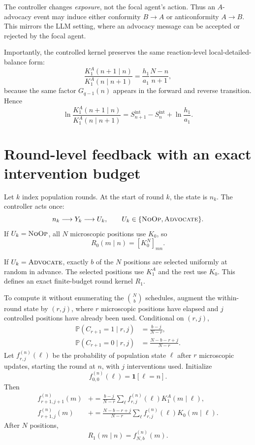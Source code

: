 \documentclass[11pt]{article}
\newcommand{\Adv}{\textsc{Advocate}}
\newcommand{\Noop}{\textsc{NoOp}}
\newcommand{\Prob}{\mathbb{P}}
\begin{document}
The controller changes \emph{exposure}, not the focal agent's action. Thus an
$A$-advocacy event may induce either conformity $B\to A$ or anticonformity
$A\to B$. This mirrors the LLM setting, where an advocacy message can be
accepted or rejected by the focal agent.

Importantly, the controlled kernel preserves the same reaction-level
local-detailed-balance form:
\[
\frac{K_1^A(n+1\mid n)}
     {K_1^A(n\mid n+1)}
=
\frac{h_1}{a_1}\frac{N-n}{n+1},
\]
because the same factor $G_{q-1}(n)$ appears in the forward and reverse
transition. Hence
\[
\ln
\frac{K_1^A(n+1\mid n)}
     {K_1^A(n\mid n+1)}
=
S_{n+1}^{\mathrm{int}}-S_n^{\mathrm{int}}
+\ln\frac{h_1}{a_1}.
\]

\section{Round-level feedback with an exact intervention budget}

Let $k$ index population rounds. At the start of round $k$, the state is $n_k$.
The controller acts once:
\[
n_k \longrightarrow Y_k \longrightarrow U_k,
\qquad
U_k\in\{\Noop,\Adv\}.
\]
If $U_k=\Noop$, all $N$ microscopic positions use $K_0$, so
\[
R_0(m\mid n)=\left[K_0^N\right]_{mn}.
\]

If $U_k=\Adv$, exactly $b$ of the $N$ positions are selected uniformly at random
in advance. The selected positions use $K_1^A$ and the rest use $K_0$. This
defines an exact finite-budget round kernel $R_1$.

To compute it without enumerating the $\binom{N}{b}$ schedules, augment the
within-round state by $(r,j)$, where $r$ microscopic positions have elapsed and
$j$ controlled positions have already been used. Conditional on $(r,j)$,
\begin{align}
\Prob(C_{r+1}=1\mid r,j)
&=\frac{b-j}{N-r},\\
\Prob(C_{r+1}=0\mid r,j)
&=\frac{N-b-r+j}{N-r}.
\end{align}
Let $f_{r,j}^{(n)}(\ell)$ be the probability of population state $\ell$ after
$r$ microscopic updates, starting the round at $n$, with $j$ interventions used.
Initialize
\[
f_{0,0}^{(n)}(\ell)=\mathbf{1}[\ell=n].
\]
Then
\begin{align}
f_{r+1,j+1}^{(n)}(m)
&\mathrel{+}=
\frac{b-j}{N-r}
\sum_{\ell}
f_{r,j}^{(n)}(\ell)K_1^A(m\mid\ell),\\
f_{r+1,j}^{(n)}(m)
&\mathrel{+}=
\frac{N-b-r+j}{N-r}
\sum_{\ell}
f_{r,j}^{(n)}(\ell)K_0(m\mid\ell).
\end{align}
After $N$ positions,
\[
\boxed{R_1(m\mid n)=f_{N,b}^{(n)}(m).}
\]
\end{document}
